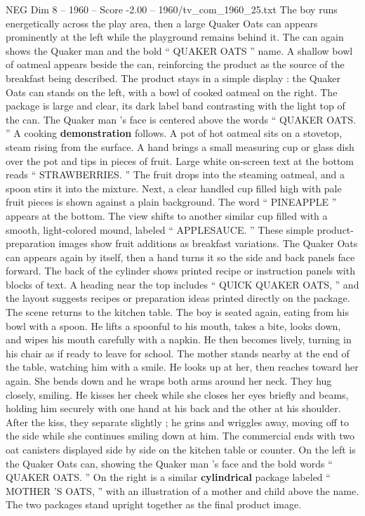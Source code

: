 \begin{textsample}{NEG Dim 8 – 1960 – Score -2.00 – 1960/tv\_com\_1960\_25.txt}
The boy runs energetically across the play area, then a large Quaker Oats can appears prominently at the left while the playground remains behind it.
The can again shows the Quaker man and the bold “ QUAKER OATS ” name.
A shallow bowl of oatmeal appears beside the can, reinforcing the product as the source of the breakfast being described.
The product stays in a simple display : the Quaker Oats can stands on the left, with a bowl of cooked oatmeal on the right.
The package is large and clear, its dark label band contrasting with the light top of the can.
The Quaker man ’s face is centered above the words “ QUAKER OATS. ” A cooking \textbf{demonstration} follows.
A pot of hot oatmeal sits on a stovetop, steam rising from the surface.
A hand brings a small measuring cup or glass dish over the pot and tips in pieces of fruit.
Large white on-screen text at the bottom reads “ STRAWBERRIES. ” The fruit drops into the steaming oatmeal, and a spoon stirs it into the mixture.
Next, a clear handled cup filled high with pale fruit pieces is shown against a plain background.
The word “ PINEAPPLE ” appears at the bottom.
The view shifts to another similar cup filled with a smooth, light-colored mound, labeled “ APPLESAUCE. ” These simple product-preparation images show fruit additions as breakfast variations.
The Quaker Oats can appears again by itself, then a hand turns it so the side and back panels face forward.
The back of the cylinder shows printed recipe or instruction panels with blocks of text.
A heading near the top includes “ QUICK QUAKER OATS, ” and the layout suggests recipes or preparation ideas printed directly on the package.
The scene returns to the kitchen table.
The boy is seated again, eating from his bowl with a spoon.
He lifts a spoonful to his mouth, takes a bite, looks down, and wipes his mouth carefully with a napkin.
He then becomes lively, turning in his chair as if ready to leave for school.
The mother stands nearby at the end of the table, watching him with a smile.
He looks up at her, then reaches toward her again.
She bends down and he wraps both arms around her neck.
They hug closely, smiling.
He kisses her cheek while she closes her eyes briefly and beams, holding him securely with one hand at his back and the other at his shoulder.
After the kiss, they separate slightly ; he grins and wriggles away, moving off to the side while she continues smiling down at him.
The commercial ends with two oat canisters displayed side by side on the kitchen table or counter.
On the left is the Quaker Oats can, showing the Quaker man ’s face and the bold words “ QUAKER OATS. ” On the right is a similar \textbf{cylindrical} package labeled “ MOTHER ’S OATS, ” with an illustration of a mother and child above the name.
The two packages stand upright together as the final product image.

\end{textsample}
